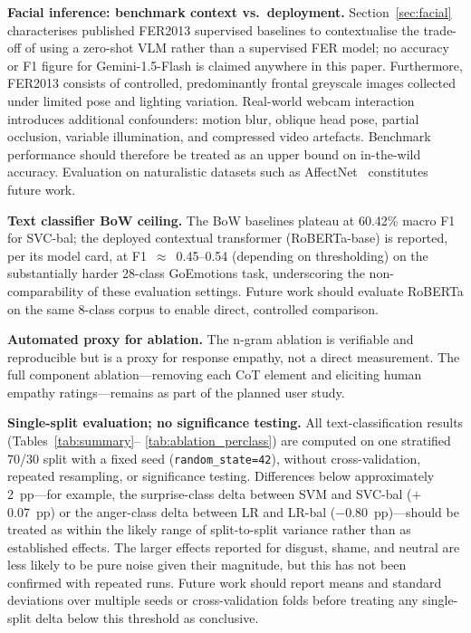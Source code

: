\documentclass[sigconf, review=true]{acmart}
\begin{document}
\textbf{Facial inference: benchmark context vs.\ deployment.}
Section~\ref{sec:facial} characterises published FER2013
supervised baselines to contextualise the trade-off of using a
zero-shot VLM rather than a supervised FER model; no accuracy or
F1 figure for Gemini-1.5-Flash is claimed anywhere in this paper.
Furthermore, FER2013 consists of controlled, predominantly
frontal greyscale images collected under limited pose and
lighting variation.
Real-world webcam interaction introduces additional
confounders: motion blur, oblique head pose, partial
occlusion, variable illumination, and compressed video
artefacts.
Benchmark performance should therefore be treated as an
upper bound on in-the-wild accuracy.
Evaluation on naturalistic datasets such as
AffectNet~\cite{mollahosseini2019affectnet} constitutes
future work.

\textbf{Text classifier BoW ceiling.}
The BoW baselines plateau at 60.42\% macro F1 for SVC-bal;
the deployed contextual transformer (RoBERTa-base) is reported,
per its model card, at F1~$\approx$~0.45--0.54 (depending on
thresholding) on the substantially harder 28-class GoEmotions
task, underscoring the non-comparability of these evaluation
settings.
Future work should evaluate RoBERTa on the same 8-class corpus
to enable direct, controlled comparison.

\textbf{Automated proxy for ablation.}
The n-gram ablation is verifiable and reproducible but is
a proxy for response empathy, not a direct measurement.
The full component ablation---removing each CoT element and
eliciting human empathy ratings---remains as part of the
planned user study.

\textbf{Single-split evaluation; no significance testing.}
All text-classification results (Tables~\ref{tab:summary}--%
\ref{tab:ablation_perclass}) are computed on one stratified
70/30 split with a fixed seed (\texttt{random\_state=42}), without
cross-validation, repeated resampling, or significance testing.
Differences below approximately 2~pp---for example, the
surprise-class delta between SVM and SVC-bal ($+$0.07~pp) or the
anger-class delta between LR and LR-bal ($-$0.80~pp)---should be
treated as within the likely range of split-to-split variance
rather than as established effects.
The larger effects reported for disgust, shame, and neutral are
less likely to be pure noise given their magnitude, but this has
not been confirmed with repeated runs.
Future work should report means and standard deviations over
multiple seeds or cross-validation folds before treating any
single-split delta below this threshold as conclusive.
\end{document}

